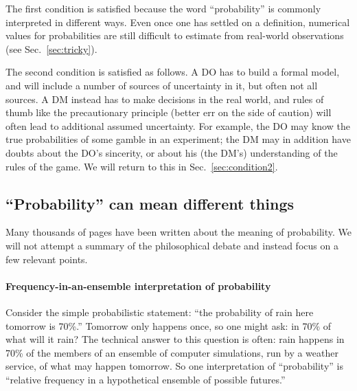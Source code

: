 \documentclass[a4paper, 12pt]{article}
\newcommand{\seclabel}[1]{\label{sec:#1}}
\newcommand{\secref}[1]{Sec.~\ref{sec:#1}}
\newcommand{\ie}{{\it i.e.}\ }
\newcommand{\eg}{{\it e.g.}\ }
\begin{document}
The first condition is satisfied because the word ``probability'' is commonly interpreted in different ways. Even once one has settled on a definition, numerical values for probabilities are still difficult to estimate from real-world observations (see \secref{tricky}).

The second condition is satisfied as follows. A DO has to build a formal model, and will include a number of sources of uncertainty in it, but often not all sources. A DM instead has to make decisions in the real world, and rules of thumb like the precautionary principle (better err on the side of caution) will often lead to additional assumed uncertainty. For example, the DO may know the true probabilities of some gamble in an experiment; the DM may in addition have doubts about the DO's sincerity, or about his (the DM's) understanding of the rules of the game. We will return to this in \secref{condition2}.

\subsection{``Probability'' can mean different things \seclabel{tricky}}

Many thousands of pages have been written about the meaning of probability. We will not attempt a summary of the philosophical debate and instead focus on a few relevant points.


\paragraph{Frequency-in-an-ensemble interpretation of probability}
Consider the simple probabilistic statement: ``the probability of rain here tomorrow is 70\%.'' Tomorrow only happens once, so one might ask: in 70\% of what will it rain? The technical answer to this question is often: rain happens in 70\% of the members of an ensemble of computer simulations, run by a weather service, of what may happen tomorrow. So one interpretation of ``probability'' is ``relative frequency in a hypothetical ensemble of possible futures.'' 
\end{document}
